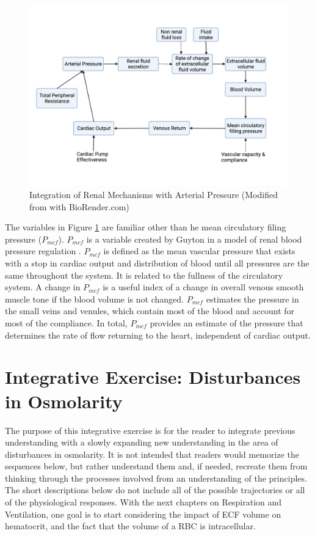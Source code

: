 \begin{figure}[!h]
    \centering
    \includegraphics[width=1\linewidth]{./figure/integrated_renal_bp.png}
    \caption{Integration of Renal Mechanisms with Arterial Pressure  \footnotesize{(Modified from \cite{hall_guyton_2020} with BioRender.com)}}
    \label{fig:integrated_renal_bp}
\end{figure}

The variables in Figure \ref{fig:integrated_renal_bp} are familiar other than he mean circulatory filing pressure ($P_{mcf}$). $P_{mcf}$ is a variable created by Guyton in a model of renal blood pressure regulation \cite{rothe_mean_1993}. $P_{mcf}$ is defined as the mean vascular pressure that exists with a stop in cardiac output and distribution of blood until all pressures are the same throughout the system. It is related to the fullness of the circulatory system. A change in $P_{mcf}$ is a useful index of a change in overall venous smooth muscle tone if the blood volume is not changed. $P_{mcf}$ estimates the pressure in the small veins and venules, which contain most of the blood and account for most of the compliance. In total, $P_{mcf}$ provides an estimate of the pressure that determines the rate of flow returning to the heart, independent of cardiac output.

\section{Integrative Exercise: Disturbances in Osmolarity}

The purpose of this integrative exercise is for the reader to integrate previous understanding with a slowly expanding new understanding in the area of disturbances in osmolarity. It is not intended that readers would memorize the sequences below, but rather understand them and, if needed, recreate them from thinking through the processes involved from an understanding of the principles. The short descriptions below do not include all of the possible trajectories or all of the physiological responses. With the next chapters on Respiration and Ventilation, one goal is to start considering the impact of ECF volume on hematocrit, and the fact that the volume of a RBC is intracellular.

